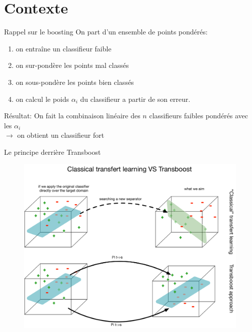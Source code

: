 \documentclass{beamer}
\begin{document}
\section{Contexte}
\begin{frame}{Rappel sur le boosting}
	On part d'un ensemble de points pondérés:
    \begin{enumerate}
      \item on entraîne un classifieur faible
      \item on sur-pondère les points mal class\'es
      \item on sous-pondère les points bien class\'es
      \item on calcul le poids $\alpha_i$ du classifieur a partir de son erreur.
    \end{enumerate}
    \begin{block}{R\'esultat:}
      On fait la combinaison linéaire des $n$ classifieurs faibles pondérés avec les $\alpha_i$\\
      $\rightarrow$ on obtient un classifieur fort
    \end{block}
    
\end{frame}
\begin{frame}{Le principe derri\`ere Transboost}
	\begin{figure}
		\includegraphics[width=.85\textwidth]{fig2.pdf}
	\end{figure}
\end{frame}
\end{document}
